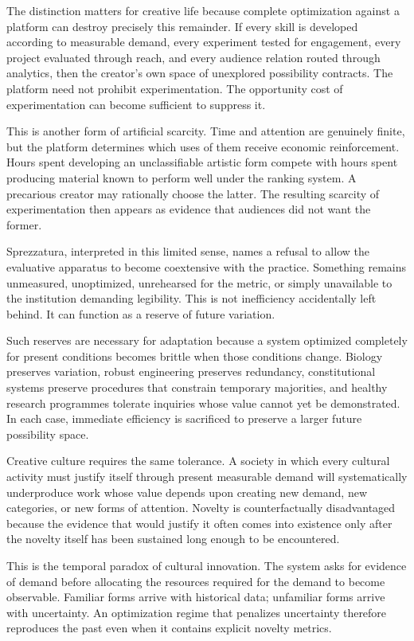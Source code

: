 \documentclass[11pt]{article}
\begin{document}
The distinction matters for creative life because complete optimization against a platform can destroy precisely this remainder. If every skill is developed according to measurable demand, every experiment tested for engagement, every project evaluated through reach, and every audience relation routed through analytics, then the creator's own space of unexplored possibility contracts. The platform need not prohibit experimentation. The opportunity cost of experimentation can become sufficient to suppress it.

This is another form of artificial scarcity. Time and attention are genuinely finite, but the platform determines which uses of them receive economic reinforcement. Hours spent developing an unclassifiable artistic form compete with hours spent producing material known to perform well under the ranking system. A precarious creator may rationally choose the latter. The resulting scarcity of experimentation then appears as evidence that audiences did not want the former.

Sprezzatura, interpreted in this limited sense, names a refusal to allow the evaluative apparatus to become coextensive with the practice. Something remains unmeasured, unoptimized, unrehearsed for the metric, or simply unavailable to the institution demanding legibility. This is not inefficiency accidentally left behind. It can function as a reserve of future variation.

Such reserves are necessary for adaptation because a system optimized completely for present conditions becomes brittle when those conditions change. Biology preserves variation, robust engineering preserves redundancy, constitutional systems preserve procedures that constrain temporary majorities, and healthy research programmes tolerate inquiries whose value cannot yet be demonstrated. In each case, immediate efficiency is sacrificed to preserve a larger future possibility space.

Creative culture requires the same tolerance. A society in which every cultural activity must justify itself through present measurable demand will systematically underproduce work whose value depends upon creating new demand, new categories, or new forms of attention. Novelty is counterfactually disadvantaged because the evidence that would justify it often comes into existence only after the novelty itself has been sustained long enough to be encountered.

This is the temporal paradox of cultural innovation. The system asks for evidence of demand before allocating the resources required for the demand to become observable. Familiar forms arrive with historical data; unfamiliar forms arrive with uncertainty. An optimization regime that penalizes uncertainty therefore reproduces the past even when it contains explicit novelty metrics.
\end{document}
